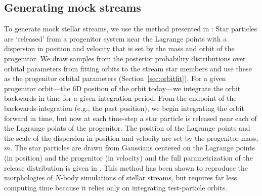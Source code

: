 \documentclass[numberedappendix]{emulateapj}
\begin{document}

\subsection{Generating mock streams}\label{sec:mocks}

To generate mock stellar streams, we use the method presented in \citet{fardal14}: Star particles are `released' from a progenitor system near the Lagrange points with a dispersion in position and velocity that is set by the mass and orbit of the progenitor. We draw samples from the posterior probability distributions over orbital parameters from fitting orbits to the stream star members and use these as the progenitor orbital parameters (Section~\ref{sec:orbitfit}). For a given progenitor orbit---the 6D position of the orbit today---we integrate the orbit backwards in time for a given integration period. From the endpoint of the backwards-integration (e.g., the past position), we begin integrating the orbit forward in time, but now at each time-step a star particle is released near each of the Lagrange points of the progenitor. The position of the Lagrange points and the scale of the dispersion in position and velocity are set by the progenitor mass, $m$. The star particles are drawn from Gaussians centered on the Lagrange points (in position) and the progenitor (in velocity) and the full parametrization of the release distribution is given in \cite{fardal14}. This method has been shown to reproduce the morphologies of $N$-body simulations of stellar streams, but requires far less computing time because it relies only on integrating test-particle orbits. 
\end{document}
